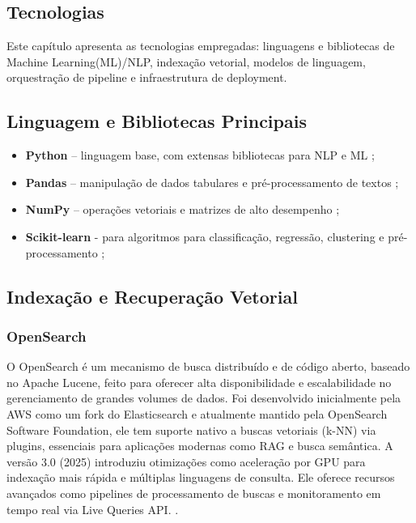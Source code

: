 \begin{description}
\chapter{Tecnologias}

\label{chap:tecnologias}
Este capítulo apresenta as tecnologias empregadas: linguagens e bibliotecas de Machine Learning(ML)/NLP, indexação vetorial, modelos de linguagem, orquestração de pipeline e infraestrutura de deployment.  
\section{Linguagem e Bibliotecas Principais}
\begin{itemize}[label=\textbullet]

\item \textbf{Python} – linguagem base, com extensas bibliotecas para NLP e ML  \cite{python2024reference};
\item \textbf{Pandas} – manipulação de dados tabulares e pré-processamento de textos  \cite{pandas2024};
\item \textbf{NumPy} – operações vetoriais e matrizes de alto desempenho \cite{numpy2025};
\item \textbf{Scikit-learn} - para algoritmos para classificação, regressão, clustering e pré-processamento \cite{scikit-learn};



\end{itemize}

\section{Indexação e Recuperação Vetorial}
\subsection{OpenSearch}
O OpenSearch é um mecanismo de busca distribuído e de código aberto, baseado no Apache Lucene, feito para oferecer alta disponibilidade e escalabilidade no gerenciamento de grandes volumes de dados. Foi desenvolvido inicialmente pela AWS como um fork do Elasticsearch e atualmente mantido pela OpenSearch Software Foundation, ele tem suporte nativo a buscas vetoriais (k-NN) via plugins, essenciais para aplicações modernas como RAG e busca semântica. 
A versão 3.0 (2025) introduziu otimizações como aceleração por GPU para indexação mais rápida e múltiplas linguagens de consulta. Ele oferece recursos avançados como pipelines de processamento de buscas e monitoramento em tempo real via Live Queries API. \cite{taipalus2024vector,opensearch2025}.


\end{description}
